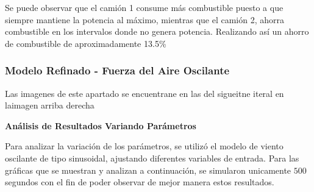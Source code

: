 \documentclass[11pt,stdletter,orderfromtodate,sigleft,twoside]{report}
\begin{document}
Se puede observar que el camión 1 consume más combustible puesto a que siempre mantiene la potencia al máximo, mientras que el camión 2, ahorra combustible en los intervalos donde no genera potencia. Realizando así un ahorro de combustible de aproximadamente 13.5\%


\subsubsection{Modelo Refinado - Fuerza del Aire Oscilante}


Las imagenes de este apartado se encuentrane en las del sigueitne iteral en laimagen arriba derecha 


\textbf{Análisis de Resultados Variando Parámetros}


Para analizar la variación de los parámetros, se utilizó el modelo de viento oscilante de tipo sinusoidal, ajustando diferentes variables de entrada. Para las gráficas que se muestran y analizan a continuación, se simularon unicamente $500$ segundos con el fin de poder observar de mejor manera estos resultados.
\end{document}
